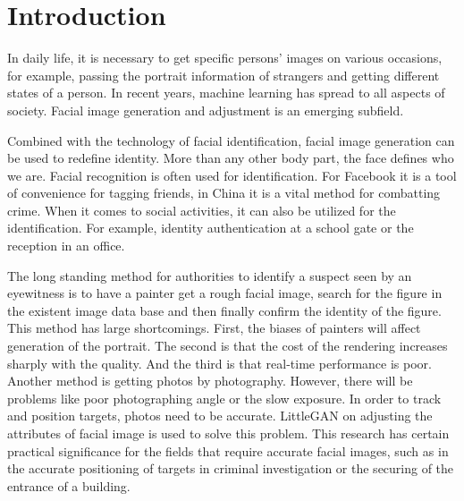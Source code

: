 \section{Introduction}
In daily life, it is necessary to get specific persons' images on various occasions,
    for example, passing the portrait information of strangers and getting different states of a person.
In recent years, machine learning has spread to all aspects of society.
Facial image generation and adjustment is an emerging subfield.

Combined with the technology of facial identification,
    facial image generation can be used to redefine identity.
More than any other body part, the face defines who we are.
Facial recognition is often used for identification.
For Facebook it is a tool of convenience for tagging friends,
    in China it is a vital method for combatting crime.
When it comes to social activities, it can also be utilized for the identification.
For example, identity authentication at a school gate or the reception in an office.

The long standing method for authorities to identify a suspect seen by an eyewitness is to have a painter get a rough facial image,
    search for the figure in the existent image data base and then finally confirm the identity of the figure.
This method has large shortcomings.
First, the biases of painters will affect generation of the portrait.
The second is that the cost of the rendering increases sharply with the quality.
And the third is that real-time performance is poor.
Another method is getting photos by photography.
However, there will be problems like poor photographing angle or the slow exposure.
In order to track and position targets, photos need to be accurate.
LittleGAN on adjusting the attributes of facial image is used to solve this problem.
This research has certain practical significance for the fields that require accurate facial images,
    such as in the accurate positioning of targets in criminal investigation or the securing of the entrance of a building.